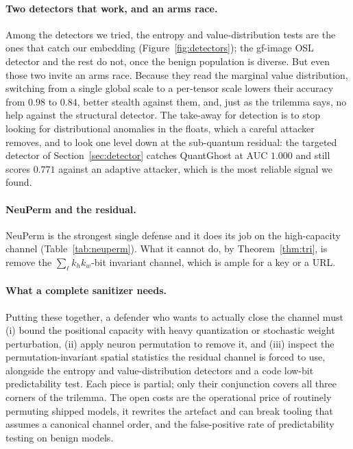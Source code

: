 \documentclass[a4paper,fleqn]{cas-dc}
\theoremstyle{plain}
\theoremstyle{remark}
\newcommand{\sys}{\mbox{QuantGhost}}
\begin{document}
\paragraph{Two detectors that work, and an arms race.} Among the detectors we tried,
the entropy and value-distribution tests are the ones that catch our embedding
(Figure~\ref{fig:detectors}); the gf-image OSL detector and the rest do not, once the
benign population is diverse. But even those two invite an arms race. Because they read
the marginal value distribution, switching from a single global scale to a per-tensor
scale lowers their accuracy from $0.98$ to $0.84$, better stealth against them, and,
just as the trilemma says, no help against the structural detector. The take-away for
detection is to stop looking for distributional anomalies in the floats, which a careful
attacker removes, and to look one level down at the sub-quantum residual: the targeted
detector of Section~\ref{sec:detector} catches \sys{} at AUC $1.000$ and still scores
$0.771$ against an adaptive attacker, which is the most reliable signal we found.

\paragraph{NeuPerm and the residual.} NeuPerm is the strongest single defense and it
does its job on the high-capacity channel (Table~\ref{tab:neuperm}). What it cannot do,
by Theorem~\ref{thm:tri}, is remove the $\sum_\ell k_h k_w$-bit invariant channel,
which is ample for a key or a URL.

\paragraph{What a complete sanitizer needs.} Putting these together, a defender who
wants to actually close the channel must (i) bound the positional capacity with heavy
quantization or stochastic weight perturbation, (ii) apply neuron permutation to remove
it, and (iii) inspect the permutation-invariant spatial statistics the residual channel
is forced to use, alongside the entropy and value-distribution detectors and a code
low-bit predictability test. Each piece is partial; only their conjunction covers all
three corners of the trilemma. The open costs are the operational price of routinely
permuting shipped models, it rewrites the artefact and can break tooling that
assumes a canonical channel order, and the false-positive rate of predictability
testing on benign models.
\end{document}
